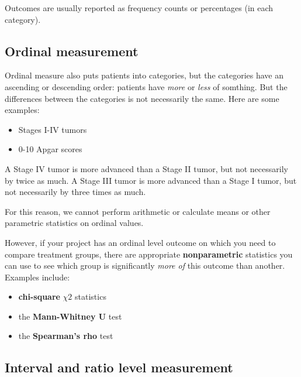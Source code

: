 \documentclass[
  letterpaper,
  DIV=11,
  numbers=noendperiod]{scrreprt}
\providecommand{\tightlist}{%
  \setlength{\itemsep}{0pt}\setlength{\parskip}{0pt}}\usepackage{longtable,booktabs,array}
\begin{document}
Outcomes are usually reported as frequency counts or percentages (in
each category).

\hypertarget{ordinal-measurement}{%
\subsection*{Ordinal measurement}\label{ordinal-measurement}}

Ordinal measure also puts patients into categories, but the categories
have an ascending or descending order: patients have \emph{more} or
\emph{less} of somthing. But the differences between the categories is
not necessarily the same. Here are some examples:

\begin{itemize}
\tightlist
\item
  Stages I-IV tumors
\item
  0-10 Apgar scores
\end{itemize}

A Stage IV tumor is more advanced than a Stage II tumor, but not
necessarily by twice as much. A Stage III tumor is more advanced than a
Stage I tumor, but not necessarily by three times as much.

For this reason, we cannot perform arithmetic or calculate means or
other parametric statistics on ordinal values.

However, if your project has an ordinal level outcome on which you need
to compare treatment groups, there are appropriate
\textbf{nonparametric} statistics you can use to see which group is
significantly \emph{more of} this outcome than another. Examples
include:

\begin{itemize}
\tightlist
\item
  \textbf{chi-square} \(\chi 2\) statistics
\item
  the \textbf{Mann-Whitney U} test
\item
  the \textbf{Spearman's rho} test
\end{itemize}

\hypertarget{interval-and-ratio-level-measurement}{%
\subsection*{Interval and ratio level
measurement}\label{interval-and-ratio-level-measurement}}
\end{document}
